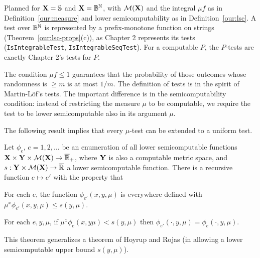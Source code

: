 \begin{formalization}
Planned for $\mathbf{X} = \mathbb{S}$ and $\mathbf{X} = \mathbb{B}^{\mathbb{N}}$, with $\mathcal{M}(\mathbf{X})$ and the integral $\mu f$ as in
Definition~\ref{our:measure} and lower semicomputability as in Definition~\ref{our:lsc}. A test
over $\mathbb{B}^{\mathbb{N}}$ is represented by a prefix-monotone function on strings
(Theorem~\ref{our:lsc-props}(c)), as Chapter 2 represents its tests (\texttt{IsIntegrableTest},
\texttt{IsIntegrableSeqTest}). For a computable $P$, the $P$-tests are exactly Chapter 2's tests
for $P$.
\end{formalization}

The condition \( \mu f\le 1 \) guarantees that the
probability of those outcomes whose randomness is \( \ge m \) is at most
\( 1/m \).
The definition of tests is in the spirit of Martin-L\"of's tests.
The important difference is in the semicomputability condition:
instead of restricting the measure \( \mu \) to be computable, we require the
test to be lower semicomputable also in its argument \( \mu \).

The following result implies that every \( \mu \)-test can be extended to a uniform
test.

 \begin{theorem}\label{thm:trim}
Let \( \phi_{e} \), \( e=1,2,\dots \) be an enumeration of all lower semicomputable
functions \( \mathbf{X}\times\mathbf{Y}\times\mathcal{M}(\mathbf{X})\to\overline{\mathbb{R}}_{+} \), where \( \mathbf{Y} \) is also a
computable
metric space, and \( s:\mathbf{Y}\times\mathcal{M}(\mathbf{X})\to\overline{\mathbb{R}} \) a lower semicomputable
function.
There is a recursive function \( e\mapsto e' \) with the property that
 \begin{alphenum}
  \item For each \( e \), the function \( \phi_{e'}(x,y,\mu) \) is everywhere defined
with \( \mu^{x}\phi_{e'}(x,y,\mu)\le s(y,\mu) \).     
  \item For each \( e,y,\mu \), if \( \mu^{x} \phi_{e}(x,y\mu)<s(y,\mu) \) then 
\( \phi_{e'}(\cdot,y,\mu)=\phi_{e}(\cdot,y,\mu) \).
 \end{alphenum}
 \end{theorem}
This theorem generalizes a theorem of Hoyrup and Rojas (in allowing a lower
semicomputable upper bound \( s(y,\mu) \)).

